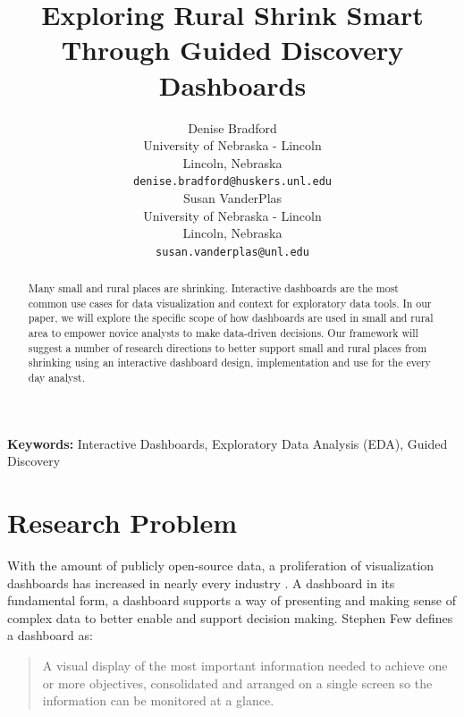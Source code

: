 \documentclass[10pt]{article}\usepackage[]{graphicx}\usepackage[]{color}
\title{Exploring Rural Shrink Smart Through Guided Discovery Dashboards}
\author{
  Denise Bradford \\
  University of Nebraska - Lincoln \\
  Lincoln, Nebraska \\
  {\tt denise.bradford@huskers.unl.edu} \\\And
  Susan VanderPlas \\
  University of Nebraska - Lincoln \\
  Lincoln, Nebraska \\
  {\tt susan.vanderplas@unl.edu} \\}
\date{}
\begin{document}
\maketitle
\begin{abstract}
Many small and rural places are shrinking. Interactive dashboards are the most common use cases for data visualization and context for exploratory data tools. In our paper, we will explore the specific scope of how dashboards are used in small and rural area to empower novice analysts to make data-driven decisions. Our framework will suggest a number of research directions to better support small and rural places from shrinking using an interactive dashboard design, implementation and use for the every day analyst. 
\end{abstract}

{\bf Keywords:} Interactive Dashboards, Exploratory Data Analysis (EDA), Guided Discovery

\section{Research Problem}
With the amount of publicly open-source data, a proliferation of visualization dashboards has increased in nearly every industry \cite{fisher}. A dashboard in its fundamental form, a dashboard supports a way of presenting and making sense of complex data to better enable and support decision making. Stephen Few defines a dashboard as:

\begin{quotation}%
\small A visual display of the most important information needed to achieve one or more objectives, consolidated and arranged on a single screen so the information can be monitored at a glance. \cite{few}
\end{quotation}
\end{document}
